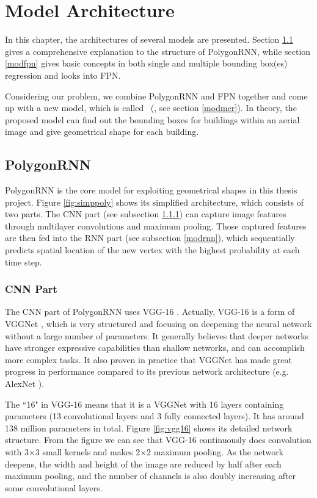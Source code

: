 \chapter{Model Architecture}\label{mdlarc}
In this chapter, the architectures of several models are presented. Section \ref{modpoly} gives a comprehensive explanation to the structure of PolygonRNN, while section \ref{modfpn} gives basic concepts in both single and multiple bounding box(es) regression and looks into FPN.

Considering our problem, we combine PolygonRNN and FPN together and come up with a new model, which is called \modelnameshort\ (\modelnamelong, see section \ref{modmer}). In theory, the proposed model can find out the bounding boxes for buildings within an aerial image and give geometrical shape for each building.
 
\section{PolygonRNN}\label{modpoly}

PolygonRNN is the core model for exploiting geometrical shapes in this thesis project. Figure \ref{fig:simppoly} shows its simplified architecture, which consists of two parts. The CNN part (see subsection \ref{modcnn}) can capture image features through multilayer convolutions and maximum pooling. Those captured features are then fed into the RNN part (see subsection \ref{modrnn}), which sequentially predicts spatial location of the new vertex with the highest probability at each time step.



\subsection{CNN Part}\label{modcnn}
The CNN part of PolygonRNN uses VGG-16 \cite{vgg16}. Actually, VGG-16 is a form of VGGNet \cite{vgg16}, which is very structured and focusing on deepening the  neural network without a large number of parameters. It generally believes that deeper networks have stronger expressive capabilities than shallow networks, and can accomplish more complex tasks. It also proven in practice that VGGNet has made great progress in performance compared to its previous network architecture (e.g. AlexNet \cite{alexnet}).

The ``16" in VGG-16 means that it is a VGGNet with 16 layers containing parameters (13 convolutional layers and 3 fully connected layers). It has around 138 million parameters in total. Figure \ref{fig:vgg16} shows its detailed network structure. From the figure we can see that VGG-16 continuously does convolution with 3$\times$3 small kernels and makes 2$\times$2 maximum pooling. As the network deepens, the width and height of the image are reduced by half after each maximum pooling, and the number of channels is also doubly increasing after some convolutional layers.

